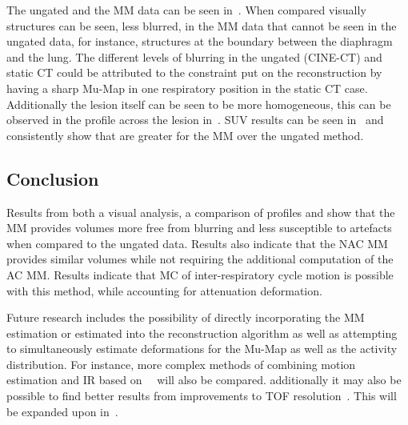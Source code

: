              The ungated and the \gls{MM} data can be seen in~. When compared visually structures can be seen, less blurred, in the \gls{MM} data that cannot be seen in the ungated data, for instance, structures at the boundary between the diaphragm and the lung. The different levels of blurring in the ungated (CINE-\gls{CT}) and static \gls{CT} could be attributed to the constraint put on the reconstruction by having a sharp \gls{Mu-Map} in one respiratory position in the static \gls{CT} case. Additionally the lesion itself can be seen to be more homogeneous, this can be observed in the profile across the lesion in~. \gls{SUV} results can be seen in~ and consistently show that  are greater for the \gls{MM} over the ungated method.
            
        \subsection{Conclusion} \label{sec:pet_ct_respiratory_motion_correction_with_a_single_attenuation_map_using_nac_derived_deformation_fields_conclusion}
            Results from both a visual analysis, a comparison of profiles and  show that the \gls{MM} provides volumes more free from blurring and less susceptible to artefacts when compared to the ungated data. Results also indicate that the \gls{NAC} \gls{MM} provides similar volumes while not requiring the additional computation of the \gls{AC} \gls{MM}. Results indicate that \gls{MC} of inter-respiratory cycle motion is possible with this method, while accounting for attenuation deformation.
            
            Future research includes the possibility of directly incorporating the \gls{MM} estimation or estimated  into the reconstruction algorithm as well as  attempting to simultaneously estimate deformations for the \gls{Mu-Map} as well as the activity distribution. For instance, more complex methods of combining motion estimation and \gls{IR} based on~\parencite{Bousse2016a}~\parencite{Bousse2016} will also be compared. additionally it may also be possible to find better results from improvements to \gls{TOF} resolution~\parencite{Efthimiou2020UseScanners, Efthimiou2020TOF-PETBGO}. This will be expanded upon in~.
    
